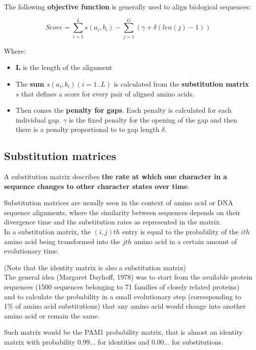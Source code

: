 The following \textbf{objective function} is generally used to align biological
sequences:

\begin{equation}
Score = \sum_{i=1}^{L} s(a_i,b_i) - \sum_{j=1}^{G} (\gamma + \delta(len(j)-1))
\end{equation}

Where:
\begin{itemize}
  \item \textbf{L} is the length of the alignment
  \item The \textbf{sum $s(a_i,b_i) (i=1..L) $} is calculated from the
\textbf{substitution matrix} $s$ that defines a score for every pair of aligned
amino acids.
  \item Then comes the \textbf{penalty for gaps}. Each penalty is calculated
 for each individual gap. \textbf{$\gamma$} is the fixed penalty for the
 opening of the gap and then there is a penalty proportional to to gap length
\textbf{$\delta$}.
\end{itemize}

\subsection{Substitution matrices}

A substitution matrix describes \textbf{the rate at which one character in a
sequence changes to other character states over time}. 

Substitution matrices are usually seen in the context of amino acid or DNA
sequence alignments, where the similarity between sequences depends on their
divergence time and the substitution rates as represented in the matrix. \\

In a substitution matrix, the $(i,j)th$ entry is equal to the probability of
the $ith$ amino acid being transformed into the $jth$ amino acid in a certain
amount of evolutionary time. 

(Note that the identity matrix is also a substitution matrix) \\

The general idea (Margaret Dayhoff, 1978) was to start from the available
protein sequences (1500 sequences belonging to 71 families of closely related
proteins) and to calculate the probability in a small evolutionary step
(corresponding to 1\% of amino acid substitutions) that any amino acid would
change into another amino acid or remain the same.

Such matrix would be the PAM1 probability matrix, that is almost an identity
matrix with probability 0.99... for identities and 0.00... for substitutions.

